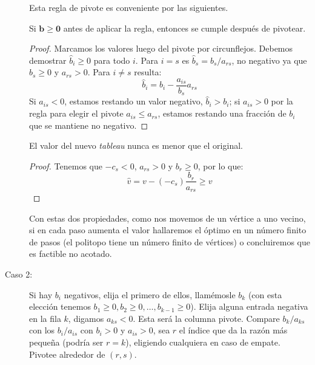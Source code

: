 \begin{description}
    Esta regla de pivote es conveniente
    por las siguientes.
    \begin{proposition}
      \label{prop:pivot-1-1}
      Si \(\mathbf{b} \ge \mathbf{0}\) antes de aplicar la regla,
      entonces se cumple después de pivotear.
    \end{proposition}
    \begin{proof}
      Marcamos los valores luego del pivote por circunflejos.
      Debemos demostrar \(\widehat{b}_i \ge 0\) para todo \(i\).
      Para \(i = s\)
      es \(\widehat{b}_s = b_s / a_{r s}\),
      no negativo ya que \(b_s \ge 0\) y \(a_{r s} > 0\).
      Para \(i \ne s\) resulta:
      \begin{equation*}
        \widehat{b}_i
          = b_i - \frac{a_{i s}}{b_s}{a_{r s}}
      \end{equation*}
      Si \(a_{i s} < 0\),
      estamos restando un valor negativo,
      \(\widehat{b}_i > b_i\);
      si \(a_{i s} > 0\) por la regla para elegir el pivote
      \(a_{i s} \le a_{r s}\),
      estamos restando una fracción de \(b_i\) que se mantiene no negativo.
    \end{proof}
    \begin{proposition}
      El valor del nuevo \emph{\foreignlanguage{french}{tableau}}
      nunca es menor que el original.
    \end{proposition}
    \begin{proof}
      Tenemos que \(-c_s < 0\), \(a_{r s} > 0\) y \(b_r \ge 0\),
      por lo que:
      \begin{equation*}
        \widehat{v}
          =   v - (-c_s) \frac{b_r}{a_{r s}}
          \ge v
      \end{equation*}
    \end{proof}
    Con estas dos propiedades,
    como nos movemos de un vértice a uno vecino,
    si en cada paso aumenta el valor
    hallaremos el óptimo en un número finito de pasos
    (el politopo tiene un número finito de vértices)
    o concluiremos que es factible no acotado.
  \item[Caso 2:]
    Si hay \(b_i\) negativos,
    elija el primero de ellos,
    llamémosle \(b_k\)
    (con esta elección tenemos \(b_1 \ge 0, b_2 \ge 0, \dotsc, b_{k - 1} \ge 0\)).
    Elija alguna entrada negativa en la fila \(k\),
    digamos \(a_{k s} < 0\).
    Esta será la columna pivote.
    Compare \(b_k / a_{k s}\) con los \(b_i / a_{i s}\)
    con \(b_i > 0\) y \(a_{i s} > 0\),
    sea \(r\) el índice que da la razón más pequeña
    (podría ser \(r = k\)),
    eligiendo cualquiera en caso de empate.
    Pivotee alrededor de \((r, s)\).


\end{description}
